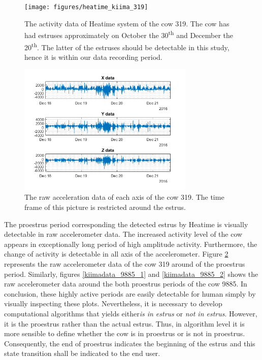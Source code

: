 \documentclass[english,12pt,a4paper,pdftex,elec,utf8]{aaltothesis}
\begin{document}
\begin{figure}[h]
\centering
\texttt{[image: figures/heatime\_kiima\_319]}
\caption{The activity data of Heatime system of the cow 319. The cow has had estruses approximately on October the 30\textsuperscript{th} and December the 20\textsuperscript{th}. The latter of the estruses should be detectable in this study, hence it is within our data recording period.}
\label{heatime_kiima_319}
\end{figure}

\begin{figure}[h]
\centering
\includegraphics[width = 0.75\textwidth]{figures/kiimadata_319.png}
\caption{The raw acceleration data of each axis of the cow 319. The time frame of this picture is restricted around the estrus.}
\label{kiimadata_319}
\end{figure}


The proestrus period corresponding the detected estrus by Heatime is visually detectable in raw accelerometer data. The increased activity level of the cow appears in exceptionally long period of high amplitude activity. Furthermore, the change of activity is detectable in all axis of the accelerometer. Figure \ref{kiimadata_319} represents the raw accelerometer data of the cow 319 around of the proestrus period. Similarly, figures \ref{kiimadata_9885_1} and \ref{kiimadata_9885_2} shows the raw accelerometer data around the both proestrus periods of the cow 9885. In conclusion, these highly active periods are easily detectable for human simply by visually inspecting these plots. Nevertheless, it is necessary to develop computational algorithms that yields either\textit{is in estrus} or \textit{not in estrus}. However, it is the proestrus rather than the actual estrus. Thus, in algorithm level it is more sensible to define whether the cow is in proestrus or is not in proestrus. Consequently, the end of proestrus indicates the beginning of the estrus and this state transition shall be indicated to the end user.
\end{document}
